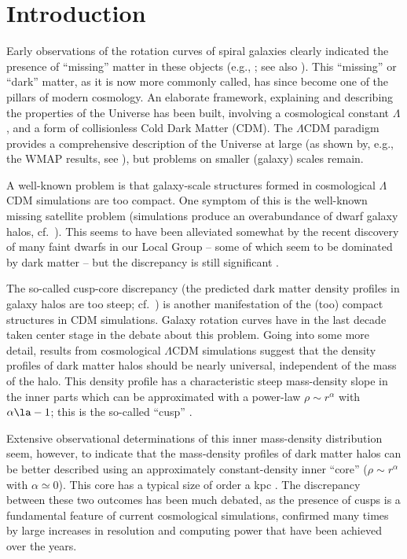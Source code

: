 \documentclass[usenatbib,usegraphicx,apjfonts,floatfix]{emulateapj}
\begin{document}


\section{Introduction}

Early observations of the rotation curves of spiral galaxies clearly
indicated the presence of  ``missing'' matter in these objects (e.g.,
\citealt{bosma_phd,rubinford,bosma81}; see also
\citealt{rotcurreview}).  This ``missing'' or ``dark'' matter, as it
is now more commonly called, has since become one of the pillars of
modern cosmology. An elaborate framework, explaining and describing
the properties of the Universe has been built, involving a
cosmological constant $\Lambda$, and a form of collisionless Cold Dark
Matter (CDM). The $\Lambda$CDM paradigm provides a comprehensive
description of the Universe at large (as shown by, e.g., the WMAP
results, see \citealt{spergel2006}), but problems on smaller (galaxy)
scales remain.

A well-known problem is that galaxy-scale structures formed in
cosmological $\Lambda$CDM simulations are too compact. One symptom of
this is the well-known missing satellite problem (simulations produce
an overabundance of dwarf galaxy halos, cf.~\citealt{moore99}).  This
seems to have been alleviated somewhat by the recent discovery of many
faint dwarfs in our Local Group -- some of which seem to be dominated by
dark matter -- but the discrepancy is still significant
\citep{simongeha}.

The so-called cusp-core discrepancy (the predicted dark matter density
profiles in galaxy halos are too steep; cf.~\citealt{dB2001}) is
another manifestation of the (too) compact structures in CDM
simulations.  Galaxy rotation curves have in the last decade taken
center stage in the debate about this problem.  Going into some more
detail, results from cosmological $\Lambda$CDM simulations suggest
that the density profiles of dark matter halos should be nearly
universal, independent of the mass of the halo. This density profile
has a characteristic steep mass-density slope in the inner parts which
can be approximated with a power-law $\rho \sim r^{\alpha}$ with
$\alpha \la -1$; this is the so-called ``cusp''
\citep[e.g.,][]{NFW96,NFW97,klypin2001,hayashi,diemand2005}.

Extensive observational determinations of this inner mass-density
distribution seem, however, to indicate that the mass-density profiles
of dark matter halos can be better described using an approximately
constant-density inner ``core'' ($\rho \sim r^{\alpha}$ with $\alpha
\simeq 0$). This core has a typical size of order a kpc
\citep[e.g.,][]{moore94,deblok1996,dBMcG1997,dB2001,dBB2002,mar2002,weldrake03,gentile2005,rachel,gentile2007}.
The discrepancy between these two outcomes has been much debated, as the
presence of cusps is a fundamental feature of current cosmological
simulations, confirmed many times by large increases in resolution and computing power
that have been achieved over the years.
\end{document}
